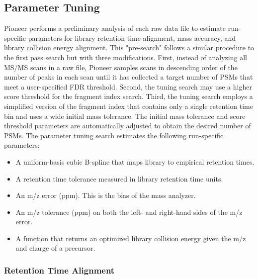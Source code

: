 \documentclass[pdflatex,sn-nature]{sn-jnl}
\begin{document}
\subsection{Parameter Tuning}\label{subsec4}

Pioneer performs a preliminary analysis of each raw data file to estimate run-specific parameters for library retention time alignment, mass accuracy, and library collision energy alignment. This "pre-search" follows a similar procedure to the first pass search but with three modifications. First, instead of analyzing all MS/MS scans in a raw file, Pioneer samples scans in descending order of the number of peaks in each scan until it has collected a target number of PSMs that meet a user-specified FDR threshold. Second, the tuning search may use a higher score threshold for the fragment index search. Third, the tuning search employs a simplified version of the fragment index that contains only a single retention time bin and uses a wide initial mass tolerance. The initial mass tolerance and score threshold parameters are automatically adjusted to obtain the desired number of PSMs. The parameter tuning search estimates the following run-specific parameters: 

 \begin{itemize}
    \item A uniform-basis cubic B-spline that maps library to empirical retention times.
    \item A retention time tolerance measured in library retention time units. 
    \item An m/z error (ppm). This is the bias of the mass analyzer.
    \item An m/z tolerance (ppm) on both the left- and right-hand sides of the m/z error.
    \item A function that returns an optimized library collision energy given the m/z and charge of a precursor. 
\end{itemize}



\subsubsection{Retention Time Alignment}\label{sec:rt_align}
\end{document}
